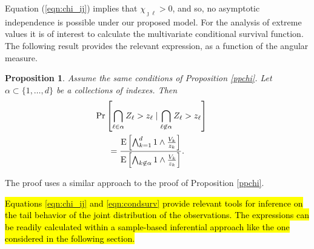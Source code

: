 \documentclass[iicol,sn-basic]{sn-jnl}
\newtheorem{prop}{Proposition}
\newcommand{\expect}[1]{\text{E}\left[#1\right]}
\theoremstyle{thmstyleone}
\begin{document}
Equation (\ref{eqn:chi_ij}) implies that $\chi_{\jmath\ell}>0$, and so, no asymptotic independence is possible under our proposed model. For the analysis of extreme values it is of interest to calculate the multivariate conditional survival function. The following result provides the relevant expression, as a function of the angular measure.
\begin{prop}
Assume the same conditions of Proposition \ref{ppchi}. Let $\alpha \subset \{1, \ldots ,d\}$ be a collections of indexes. Then
\begin{equation} \label{eqn:condsurv}
\begin{aligned}
&\hspace{-0.5cm}\mathrm{Pr}\left[\bigcap_{\ell \in \alpha} Z_\ell > z_\ell \mid \bigcap_{\ell\not\in\alpha} Z_\ell > z_\ell\right] \\
&= \frac{\expect{\bigwedge_{k = 1}^d 1\wedge \frac{V_k}{z_k}}}{\expect{\bigwedge_{k \not\in\alpha}1\wedge\frac{V_k}{z_k}}}.
\end{aligned}
\end{equation}
\end{prop}
The proof uses a similar approach to the proof of Proposition \ref{ppchi}.

\hl{Equations \mbox{\ref{eqn:chi_ij}} and \mbox{\ref{eqn:condsurv}} provide relevant tools for inference on the tail behavior of the joint distribution of the observations. The expressions can be readily calculated within a sample-based inferential approach like the one considered in the following section.}
\end{document}
